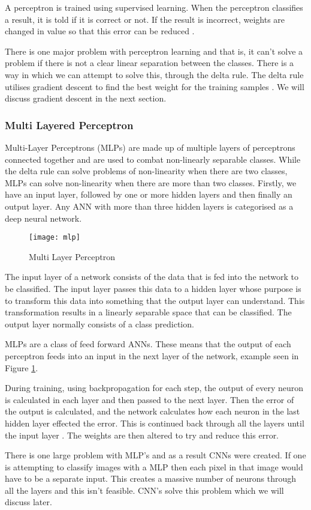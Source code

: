 A perceptron is trained using supervised learning. When the perceptron
classifies a result, it is told if it is correct or not. If the result is
incorrect, weights are changed in value so that this error can be reduced
\parencite{AI}. 

There is one major problem with perceptron learning and that is, it can't solve
a problem if there is not a clear linear separation between the classes. There
is a way in which we can attempt to solve this, through the delta rule. The
delta rule utilises gradient descent to find the best weight for the training
samples \parencite{MLANN}. We will discuss gradient descent in the next section.

\tocless\subsubsection{Multi Layered Perceptron}
Multi-Layer Perceptrons (MLPs) are made up of multiple layers of perceptrons connected
together and are used to combat non-linearly separable classes.
While the delta rule can solve problems of non-linearity when there are two classes, MLPs can solve non-linearity when there are more than two classes.
Firstly, we have an input layer, followed by one or more hidden layers and then
finally an output layer.
Any ANN with more than three hidden layers is categorised as a deep neural network.

\begin{figure}[h]
	\centering
    \texttt{[image: mlp]}
    \caption{Multi Layer Perceptron}
    \label{fig:mlp}
\end{figure}

The input layer of a network consists of the data that is fed into the network to be classified. The input layer passes this data to a hidden layer
whose purpose is to transform this data into something that the output layer can
understand. This transformation results in a linearly separable space that can be classified. The output layer normally consists of a class prediction.

MLPs are a class of feed forward ANNs.
These means that the output of each perceptron feeds into an input in the next
layer of the network, example seen in Figure \ref{fig:mlp}.

During training, using backpropagation for each step, the output of every neuron is calculated in each layer and then passed to the next layer. Then the error of the output is calculated, and the network calculates how each neuron in the last hidden layer effected the error. This is continued back through all the layers until the input layer \parencite{handsOnML}. The weights are then altered to try and reduce this error.

There is one large problem with MLP's and as a result CNNs were created. If one is attempting to classify images with a MLP then
each pixel in that image would have to be a separate input. This creates a
massive number of neurons through all the layers and this isn't feasible. CNN's
solve this problem which we will discuss later.

